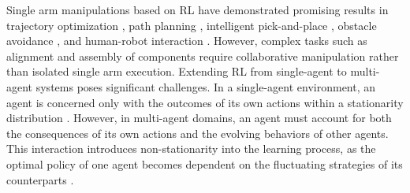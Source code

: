 \documentclass[a4paper,fleqn]{cas-dc}
\begin{document}
Single arm manipulations based on RL have demonstrated promising results in trajectory optimization \cite{intro-12, intro-13}, path planning \cite{hemalatha2026cleannav}, intelligent pick-and-place \cite{dahmani2025reinforcement, intro-14, intro-15}, obstacle avoidance \cite{intro-16, intro-17}, and human-robot interaction \cite{intro-18, intro-19}. However, complex tasks such as alignment and assembly of components require collaborative manipulation rather than isolated single arm execution. Extending RL from single-agent to multi-agent systems poses significant challenges. In a single-agent environment, an agent is concerned only with the outcomes of its own actions within a stationarity distribution \cite{intro-21}. However, in multi-agent domains, an agent must account for both the consequences of its own actions and the evolving behaviors of other agents. This interaction introduces non-stationarity into the learning process, as the optimal policy of one agent becomes dependent on the fluctuating strategies of its counterparts \cite{intro-20}.
\end{document}

